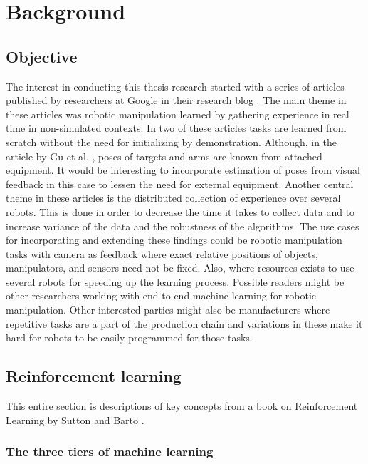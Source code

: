 \section{Background}

\subsection{Objective}

The interest in conducting this thesis research started with a series of
articles published by researchers at Google in their research blog
\cite{gu2016deep,finn2016deep,yahya2016collective,chebotar2016path}. The main
theme in these articles was robotic manipulation learned by gathering
experience in real time in non-simulated contexts. In two of these articles
\cite{gu2016deep,finn2016deep} tasks are learned from scratch without the need
for initializing by demonstration. Although, in the article by Gu et al.
\cite{gu2016deep}, poses of targets and arms are known from attached equipment.
It would be interesting to incorporate estimation of poses from visual feedback
in this case to lessen the need for external equipment. Another central theme
in these articles is the distributed collection of experience over several
robots. This is done in order to decrease the time it takes to collect data and
to increase variance of the data and the robustness of the algorithms. The use
cases for incorporating and extending these findings could be robotic
manipulation tasks with camera as feedback where exact relative positions of
objects, manipulators, and sensors need not be fixed. Also, where resources
exists to use several robots for speeding up the learning process. Possible
readers might be other researchers working with end-to-end machine learning for
robotic manipulation. Other interested parties might also be manufacturers
where repetitive tasks are a part of the production chain and variations in
these make it hard for robots to be easily programmed for those tasks.

\subsection{Reinforcement learning}

This entire section is descriptions of key concepts from a book on
Reinforcement Learning by Sutton and Barto \cite{sutton1998reinforcement}.

\subsubsection{The three tiers of machine learning}

